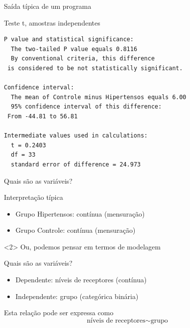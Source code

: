 \documentclass{beamer}
\begin{document}
\begin{frame}[fragile]{\scriptsize Saída típica de um programa}
  \begin{exampleblock}{Teste t, amostras independentes}
    \scriptsize
\begin{verbatim}
P value and statistical significance: 
  The two-tailed P value equals 0.8116 
  By conventional criteria, this difference
 is considered to be not statistically significant. 

Confidence interval: 
  The mean of Controle minus Hipertensos equals 6.00 
  95% confidence interval of this difference:
 From -44.81 to 56.81 

Intermediate values used in calculations: 
  t = 0.2403 
  df = 33 
  standard error of difference = 24.973 
\end{verbatim}
  \end{exampleblock}
\end{frame}


\begin{frame}{\scriptsize Quais são as variáveis?}
  \begin{block}{Interpretação típica}
    \begin{itemize}
    \footnotesize
    \item Grupo Hipertensos: contínua (mensuração)
    \item Grupo Controle: contínua (mensuração)
    \end{itemize}
  \end{block}
  \vfill
  \begin{block}{}<2>
    Ou, podemos pensar em termos de modelagem
  \end{block}
\end{frame}

\begin{frame}{\scriptsize Quais são as variáveis?}
  \begin{itemize}
    \footnotesize
  \item Dependente: níveis de receptores (contínua)
  \item Independente: grupo (categórica binária)
  \end{itemize}
  \vfill
  \begin{block}{Esta relação pode ser expressa como}
    \begin{displaymath}
      \text{níveis de receptores} \sim \text{grupo}
    \end{displaymath}
  \end{block}
\end{frame}
\end{document}

